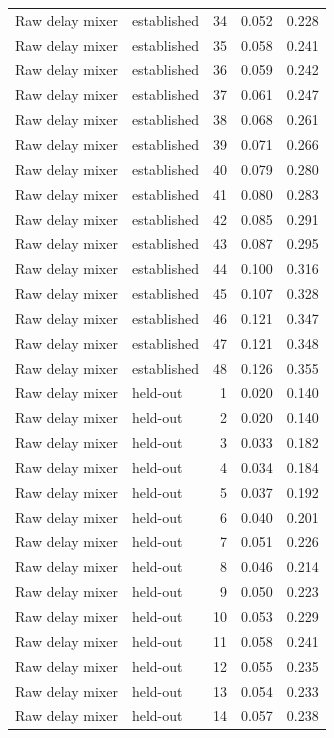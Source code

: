 \begin{tabular}{llrrr}
Raw delay mixer & established & 34 & 0.052 & 0.228 \\
Raw delay mixer & established & 35 & 0.058 & 0.241 \\
Raw delay mixer & established & 36 & 0.059 & 0.242 \\
Raw delay mixer & established & 37 & 0.061 & 0.247 \\
Raw delay mixer & established & 38 & 0.068 & 0.261 \\
Raw delay mixer & established & 39 & 0.071 & 0.266 \\
Raw delay mixer & established & 40 & 0.079 & 0.280 \\
Raw delay mixer & established & 41 & 0.080 & 0.283 \\
Raw delay mixer & established & 42 & 0.085 & 0.291 \\
Raw delay mixer & established & 43 & 0.087 & 0.295 \\
Raw delay mixer & established & 44 & 0.100 & 0.316 \\
Raw delay mixer & established & 45 & 0.107 & 0.328 \\
Raw delay mixer & established & 46 & 0.121 & 0.347 \\
Raw delay mixer & established & 47 & 0.121 & 0.348 \\
Raw delay mixer & established & 48 & 0.126 & 0.355 \\
Raw delay mixer & held-out & 1 & 0.020 & 0.140 \\
Raw delay mixer & held-out & 2 & 0.020 & 0.140 \\
Raw delay mixer & held-out & 3 & 0.033 & 0.182 \\
Raw delay mixer & held-out & 4 & 0.034 & 0.184 \\
Raw delay mixer & held-out & 5 & 0.037 & 0.192 \\
Raw delay mixer & held-out & 6 & 0.040 & 0.201 \\
Raw delay mixer & held-out & 7 & 0.051 & 0.226 \\
Raw delay mixer & held-out & 8 & 0.046 & 0.214 \\
Raw delay mixer & held-out & 9 & 0.050 & 0.223 \\
Raw delay mixer & held-out & 10 & 0.053 & 0.229 \\
Raw delay mixer & held-out & 11 & 0.058 & 0.241 \\
Raw delay mixer & held-out & 12 & 0.055 & 0.235 \\
Raw delay mixer & held-out & 13 & 0.054 & 0.233 \\
Raw delay mixer & held-out & 14 & 0.057 & 0.238 \\

\end{tabular}
